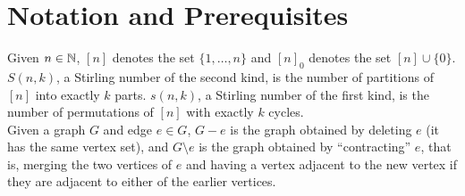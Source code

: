 \section{Notation and Prerequisites}
	
	Given $n \in \mathbb{N}$, $[n]$ denotes the set $\{1,\ldots,n\}$ and $[n]_0$ denotes the set $[n] \cup \{0\}$.\\
	$S(n,k)$, a Stirling number of the second kind, is the number of partitions of $[n]$ into exactly $k$ parts. $s(n,k)$, a Stirling number of the first kind, is the number of permutations of $[n]$ with exactly $k$ cycles.\\
	Given a graph $G$ and edge $e\in G$, $G-e$ is the graph obtained by deleting $e$ (it has the same vertex set), and $G\setminus e$ is the graph obtained by ``contracting'' $e$, that is, merging the two vertices of $e$ and having a vertex adjacent to the new vertex if they are adjacent to either of the earlier vertices.


\clearpage